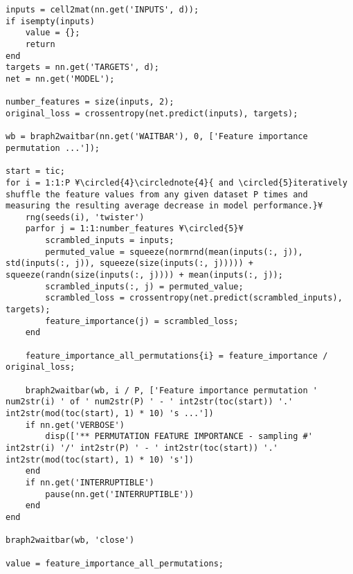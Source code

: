\documentclass{tufte-handout}
\begin{document}
\begin{lstlisting}
inputs = cell2mat(nn.get('INPUTS', d));
if isempty(inputs)
    value = {};
    return
end
targets = nn.get('TARGETS', d);
net = nn.get('MODEL');

number_features = size(inputs, 2);
original_loss = crossentropy(net.predict(inputs), targets);

wb = braph2waitbar(nn.get('WAITBAR'), 0, ['Feature importance permutation ...']);

start = tic;
for i = 1:1:P ¥\circled{4}\circlednote{4}{ and \circled{5}iteratively shuffle the feature values from any given dataset P times and measuring the resulting average decrease in model performance.}¥
    rng(seeds(i), 'twister')
    parfor j = 1:1:number_features ¥\circled{5}¥
        scrambled_inputs = inputs;
        permuted_value = squeeze(normrnd(mean(inputs(:, j)), std(inputs(:, j)), squeeze(size(inputs(:, j))))) + squeeze(randn(size(inputs(:, j)))) + mean(inputs(:, j));
        scrambled_inputs(:, j) = permuted_value;
        scrambled_loss = crossentropy(net.predict(scrambled_inputs), targets);
        feature_importance(j) = scrambled_loss;
    end

    feature_importance_all_permutations{i} = feature_importance / original_loss;

    braph2waitbar(wb, i / P, ['Feature importance permutation ' num2str(i) ' of ' num2str(P) ' - ' int2str(toc(start)) '.' int2str(mod(toc(start), 1) * 10) 's ...'])
    if nn.get('VERBOSE')
        disp(['** PERMUTATION FEATURE IMPORTANCE - sampling #' int2str(i) '/' int2str(P) ' - ' int2str(toc(start)) '.' int2str(mod(toc(start), 1) * 10) 's'])
    end
    if nn.get('INTERRUPTIBLE')
        pause(nn.get('INTERRUPTIBLE'))
    end
end

braph2waitbar(wb, 'close')

value = feature_importance_all_permutations;
\end{lstlisting}

\clearpage
\end{document}

